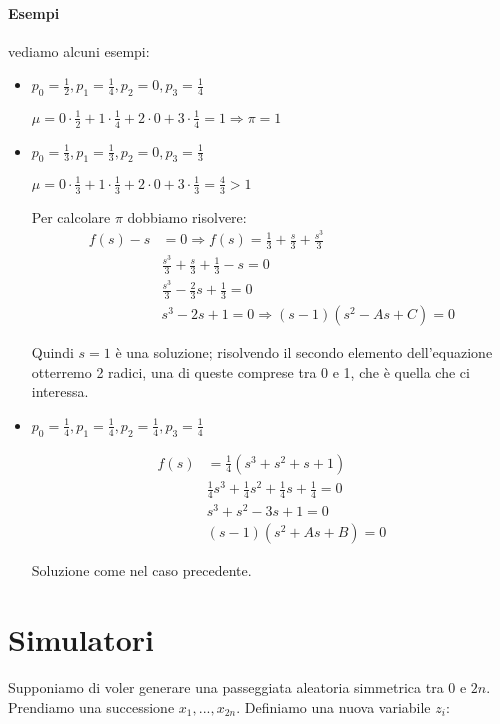\documentclass[a4paper,12pt]{book}
\begin{document}
\paragraph{Esempi} vediamo alcuni esempi:
\begin{itemize}
	\item $ p_0 = \frac{1}{2}, p_1 = \frac{1}{4}, p_2 = 0, p_3 = \frac{1}{4} $
	
	$ \mu = 0 \cdot \frac{1}{2} + 1 \cdot \frac{1}{4} + 2 \cdot 0  + 3 \cdot \frac{1}{4} = 1 \Rightarrow \pi = 1$
	\item $ p_0 = \frac{1}{3}, p_1 = \frac{1}{3}, p_2 = 0, p_3 = \frac{1}{3} $
	
	$ \mu = 0 \cdot \frac{1}{3} + 1 \cdot \frac{1}{3} + 2 \cdot 0  + 3 \cdot \frac{1}{3} = \frac{4}{3} > 1$
	
	Per calcolare $\pi$ dobbiamo risolvere:
	\begin{align*}
		f(s) - s & = 0 \Rightarrow f(s) = \frac{1}{3} + \frac{s}{3} + \frac{s^3}{3} \\
		& \frac{s^3}{3} + \frac{s}{3} + \frac{1}{3} - s = 0 \\
		& \frac{s^3}{3} - \frac{2}{3}s + \frac{1}{3} = 0 \\
		& s^3 - 2s + 1 = 0 \Rightarrow (s-1)(s^2 - As + C) = 0
	\end{align*}
	
	Quindi $ s = 1 $ è una soluzione; risolvendo il secondo elemento dell'equazione otterremo 2 radici, una di queste comprese tra 0 e 1, che è quella che ci interessa. 
	
	\item $ p_0 = \frac{1}{4}, p_1 = \frac{1}{4}, p_2 = \frac{1}{4}, p_3 = \frac{1}{4} $
	
	\begin{align*}
		f(s) & = \frac{1}{4}(s^3 + s^2 + s + 1) \\
		& \frac{1}{4}s^3 + \frac{1}{4}s^2 + \frac{1}{4}s + \frac{1}{4} = 0 \\
		& s^3 + s^2 - 3s + 1 = 0 \\
		& (s-1)(s^2 + As + B) = 0	
	\end{align*}
	
	Soluzione come nel caso precedente. 
\end{itemize}

\section{Simulatori}
Supponiamo di voler generare una passeggiata aleatoria simmetrica tra 0 e $ 2n $. Prendiamo una successione $ x_1, ..., x_{2n} $. Definiamo una nuova variabile $ z_i $:
\end{document}
